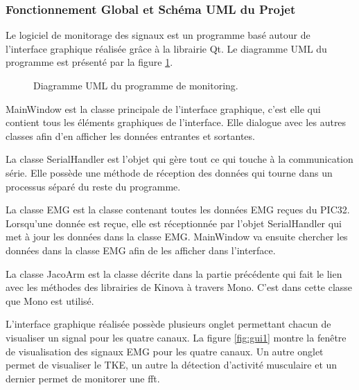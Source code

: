\documentclass[letterpaper, twoside, 12pt, memoire, creativecommons, hyperref]{thETS}
\begin{document}
\subsubsection{Fonctionnement Global et Schéma UML du Projet}

Le logiciel de monitorage des signaux est un programme basé autour de l'interface graphique réalisée grâce à la librairie Qt. Le diagramme UML du programme est présenté par la figure \ref{fig:uml}.

\begin{figure}
	\centering
	\caption{Diagramme UML du programme de monitoring.}
	\label{fig:uml}
\end{figure}

MainWindow est la classe principale de l'interface graphique, c'est elle qui contient tous les éléments graphiques de l'interface. Elle dialogue avec les autres classes afin d'en afficher les données entrantes et sortantes. 

La classe SerialHandler est l'objet qui gère tout ce qui touche à la communication série. Elle possède une méthode de réception des données qui tourne dans un processus séparé du reste du programme.

La classe EMG est la classe contenant toutes les données EMG reçues du PIC32. Lorsqu'une donnée est reçue, elle est réceptionnée par l'objet SerialHandler qui met à jour les données dans la classe EMG. MainWindow va ensuite chercher les données dans la classe EMG afin de les afficher dans l'interface. 

La classe JacoArm est la classe décrite dans la partie précédente qui fait le lien avec les méthodes des librairies de Kinova à travers Mono. C'est dans cette classe que Mono est utilisé.

L'interface graphique réalisée possède plusieurs onglet permettant chacun de visualiser un signal pour les quatre canaux. La figure \ref{fig:gui1} montre la fenêtre de visualisation des signaux EMG pour les quatre canaux. Un autre onglet permet de visualiser le TKE, un autre la détection d'activité musculaire et un dernier permet de monitorer une fft. 
\end{document}

